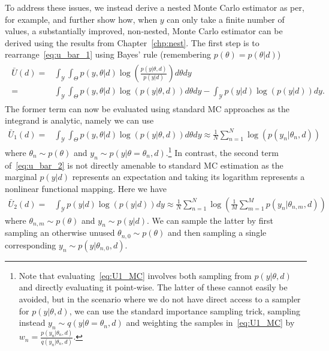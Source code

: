To address these issues, we instead derive a nested Monte Carlo estimator as per, for example,
\cite{myung2013tutorial} and further
show how, when $y$ can only take a finite number of values,
a substantially improved, non-nested, Monte Carlo estimator can be derived using the
results from Chapter~\ref{chp:nest}.
The first step is to rearrange~\eqref{eq:u_bar_1} using Bayes' rule (remembering
$p(\theta)=p(\theta|d)$)
\begin{align}
\label{eq:u_bar_2}
\begin{split}
\bar{U}(d)
=& \int_{\mathcal{Y}}\int_{\Theta} p(y,\theta | d) \log\left(\frac{p(y | \theta, d)}{p(y |d)}\right) d\theta dy \\
=&\int_{\mathcal{Y}}\int_{\Theta} p(y,\theta | d) \log(p(y | \theta, d)) d\theta dy - \int_{\mathcal{Y}} p(y | d) \log(p(y | d))dy.
\end{split}
\end{align}
The former term can now be evaluated using standard MC approaches as the integrand is analytic,
namely we can use
\begin{align}
\bar{U}_1(d) = &\int_{\mathcal{Y}}\int_{\Theta} p(y,\theta | d) \log(p(y | \theta, d)) d\theta dy
\approx \frac{1}{N} \sum_{n=1}^{N} \log(p(y_n | \theta_n, d)) \label{eq:U1_MC}
\end{align}
where $\theta_n \sim p(\theta)$ and $y_n \sim p(y|\theta=\theta_n, d)$.\footnote{Note 
	that evaluating~\eqref{eq:U1_MC} involves both
sampling from $p(y | \theta, d)$ and directly evaluating it point-wise.
The latter of these cannot easily be avoided, but in the scenario where we
do not have direct access to a sampler for $p(y | \theta, d)$, we can
use the standard importance sampling trick, sampling instead
$y_n \sim q(y|\theta=\theta_n, d)$ and weighting the samples in~\eqref{eq:U1_MC}
by $w_n = \frac{p(y_n|\theta_n, d)}{q(y_n|\theta_n, d)}$.}
In contrast, the second term of~\eqref{eq:u_bar_2} is not directly amenable to standard MC estimation
as the marginal $p(y|d)$ represents an expectation
and taking its logarithm represents a nonlinear functional mapping.  
Here we have
\begin{align}
\bar{U}_2(d) = &\int_{\mathcal{Y}} p(y | d) \log(p(y | d))dy
\approx \frac{1}{N} \sum_{n=1}^{N} \log \left(\frac{1}{M} \sum_{m=1}^{M} p(y_n | \theta_{n,m}, d)\right) \label{eq:U2_MC}
\end{align}
where $\theta_{n,m} \sim p(\theta)$ and $y_n \sim p(y | d)$.  We can sample the latter by first sampling an otherwise unused $\theta_{n,0} \sim p(\theta)$ and 
then sampling a single corresponding $y_n \sim p(y | \theta_{n,0}, d)$.

